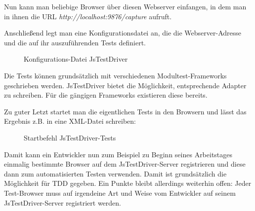Nun kann man beliebige Browser über diesen Webserver einfangen, in dem man in ihnen die URL \emph{http://localhost:9876/capture} aufruft.

Anschließend legt man eine Konfigurationsdatei an, die die Webserver-Adresse und die auf ihr auszuführenden Tests definiert.

\begin{figure}[H]
	\begin{center}
		\caption{Konfigurations-Datei JsTestDriver}
		\label{config:jstestdriver}
	\end{center}
\end{figure}

Die Tests können grundsätzlich mit verschiedenen Modultest-Frameworks geschrieben werden. JsTestDriver bietet die Möglichkeit, entsprechende Adapter zu schreiben. Für die gängigen Frameworks existieren diese bereits.

Zu guter Letzt startet man die eigentlichen Tests in den Browsern und lässt das Ergebnis z.B. in eine XML-Datei schreiben:

\begin{figure}[H]
	\begin{center}
		\caption{Startbefehl JsTestDriver-Tests}
		\label{bash:jstestdriver2}
	\end{center}
\end{figure}

Damit kann ein Entwickler nun zum Beispiel zu Beginn seines Arbeitstages einmalig bestimmte Browser auf dem JsTestDriver-Server registrieren und diese dann zum automatisierten Testen verwenden. Damit ist grundsätzlich die Möglichkeit für \ac{TDD} gegeben. Ein Punkte bleibt allerdings weiterhin offen: Jeder Test-Browser muss auf irgendeine Art und Weise vom Entwickler auf seinem JsTestDriver-Server registriert werden.

